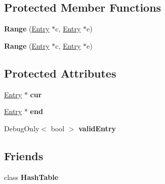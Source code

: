 \subsection*{Protected Member Functions}
\begin{DoxyCompactItemize}
\item 
\hypertarget{classjs_1_1detail_1_1_hash_table_1_1_range_a3023798f46e884ce4a80f8ee39726edc}{{\bfseries Range} (\hyperlink{classjs_1_1detail_1_1_hash_table_entry}{Entry} $\ast$c, \hyperlink{classjs_1_1detail_1_1_hash_table_entry}{Entry} $\ast$e)}\label{classjs_1_1detail_1_1_hash_table_1_1_range_a3023798f46e884ce4a80f8ee39726edc}

\item 
\hypertarget{classjs_1_1detail_1_1_hash_table_1_1_range_a3023798f46e884ce4a80f8ee39726edc}{{\bfseries Range} (\hyperlink{classjs_1_1detail_1_1_hash_table_entry}{Entry} $\ast$c, \hyperlink{classjs_1_1detail_1_1_hash_table_entry}{Entry} $\ast$e)}\label{classjs_1_1detail_1_1_hash_table_1_1_range_a3023798f46e884ce4a80f8ee39726edc}

\end{DoxyCompactItemize}
\subsection*{Protected Attributes}
\begin{DoxyCompactItemize}
\item 
\hypertarget{classjs_1_1detail_1_1_hash_table_1_1_range_a5f3e81855c5e58e22c52b4b03dfd55c6}{\hyperlink{classjs_1_1detail_1_1_hash_table_entry}{Entry} $\ast$ {\bfseries cur}}\label{classjs_1_1detail_1_1_hash_table_1_1_range_a5f3e81855c5e58e22c52b4b03dfd55c6}

\item 
\hypertarget{classjs_1_1detail_1_1_hash_table_1_1_range_a66af1be0dab67a6da1f183d36c78f819}{\hyperlink{classjs_1_1detail_1_1_hash_table_entry}{Entry} $\ast$ {\bfseries end}}\label{classjs_1_1detail_1_1_hash_table_1_1_range_a66af1be0dab67a6da1f183d36c78f819}

\item 
\hypertarget{classjs_1_1detail_1_1_hash_table_1_1_range_a101cb12ed702798190b97e7c0f65a519}{Debug\-Only$<$ bool $>$ {\bfseries valid\-Entry}}\label{classjs_1_1detail_1_1_hash_table_1_1_range_a101cb12ed702798190b97e7c0f65a519}

\end{DoxyCompactItemize}
\subsection*{Friends}
\begin{DoxyCompactItemize}
\item 
\hypertarget{classjs_1_1detail_1_1_hash_table_1_1_range_a0d65cc1d3f862388016ca21139b4659a}{class {\bfseries Hash\-Table}}\label{classjs_1_1detail_1_1_hash_table_1_1_range_a0d65cc1d3f862388016ca21139b4659a}

\end{DoxyCompactItemize}
